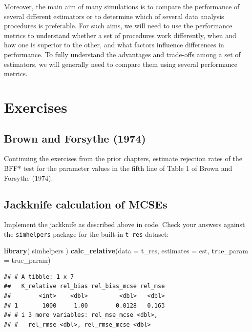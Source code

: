 \documentclass[
]{book}
\newenvironment{Shaded}{\begin{snugshade}}{\end{snugshade}}
\newcommand{\AttributeTok}[1]{\textcolor[rgb]{0.13,0.29,0.53}{#1}}
\newcommand{\FunctionTok}[1]{\textcolor[rgb]{0.13,0.29,0.53}{\textbf{#1}}}
\newcommand{\NormalTok}[1]{#1}
\begin{document}
Moreover, the main aim of many simulations is to compare the performance of several different estimators or to determine which of several data analysis procedures is preferable.
For such aims, we will need to use the performance metrics to understand whether a set of procedures work differently, when and how one is superior to the other, and what factors influence differences in performance.
To fully understand the advantages and trade-offs among a set of estimators, we will generally need to compare them using several performance metrics.

\section{Exercises}\label{exercises-6}

\subsection{Brown and Forsythe (1974)}\label{Brown-Forsythe-performance}

Continuing the exercises from the prior chapters, estimate rejection rates of the BFF* test for the parameter values in the fifth line of Table 1 of Brown and Forsythe (1974).

\subsection{Jackknife calculation of MCSEs}\label{jackknife-MCSE}

Implement the jackknife as described above in code. Check your answers against the \texttt{simhelpers} package for the built-in \texttt{t\_res} dataset:

\begin{Shaded}
\begin{Highlighting}[]
\FunctionTok{library}\NormalTok{( simhelpers )}
\FunctionTok{calc\_relative}\NormalTok{(}\AttributeTok{data =}\NormalTok{ t\_res, }\AttributeTok{estimates =}\NormalTok{ est, }\AttributeTok{true\_param =}\NormalTok{ true\_param)}
\end{Highlighting}
\end{Shaded}

\begin{verbatim}
## # A tibble: 1 x 7
##   K_relative rel_bias rel_bias_mcse rel_mse
##        <int>    <dbl>         <dbl>   <dbl>
## 1       1000     1.00        0.0128   0.163
## # i 3 more variables: rel_mse_mcse <dbl>,
## #   rel_rmse <dbl>, rel_rmse_mcse <dbl>
\end{verbatim}
\end{document}

